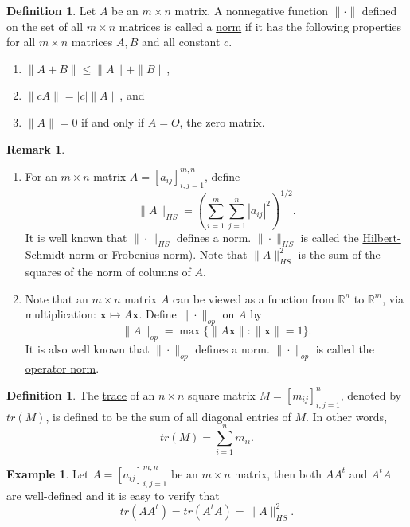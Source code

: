 \documentclass[12pt,letterpaper]{book}
\numberwithin{equation}{section}
\theoremstyle{definition}
\newtheorem{defi}[thm]{\textbf{Definition}}
\newtheorem{example}[thm]{\textbf{Example}}
\newtheorem{remark}[thm]{\textbf{Remark}}
\newcommand{\vx}{\bm{x}}
\begin{document}
\begin{defi}
Let $A$ be an $m\times n$ matrix. A nonnegative function $\|\cdot\|$ defined on the set of all $m\times n$ matrices is called a \underline{norm} if it has the following properties for all $m\times n$ matrices $A,B$ and all constant $c$.
\begin{enumerate}
\item $\|A+B\|\leq \|A\|+\|B\|$,
\item $\|cA\|=|c|\|A\|$, and
\item $\|A\|=0$ if and only if $A=O$, the zero matrix.
\end{enumerate}
\end{defi}

\begin{remark}\label{norms}\quad
\begin{enumerate}
\item For an $m\times n$ matrix $A=[a_{ij}]_{i,j=1}^{m,n}$, define
$$\|A\|_{HS}=\left(\sum_{i=1}^m\sum_{j=1}^n |a_{ij}|^2\right)^{1/2}.$$ It is well known that $\|\cdot\|_{HS}$ defines a norm. $\|\cdot\|_{HS}$ is called the \underline{Hilbert-Schmidt norm} or \underline{Frobenius norm}). Note that $\|A\|_{HS}^2$ is the sum of the squares of the norm of columns of $A$.
\item Note that an $m\times n$ matrix $A$ can be viewed as a function from $\mathbb{R}^n$ to $\mathbb{R}^m$, via multiplication: $\vx\mapsto A\vx$. Define $\|\cdot\|_{op}$ on $A$ by
$$\|A\|_{op}=\max \{\|A\vx\|:\|\vx\|=1\}.$$
It is also well known that $\|\cdot\|_{op}$ defines a norm. $\|\cdot\|_{op}$ is called the \underline{operator norm}.
\end{enumerate}
\end{remark}

\begin{defi}
The \underline{trace} of an $n\times n$ square matrix $M=[m_{ij}]_{i,j=1}^n$, denoted by $tr(M)$, is defined to be the sum of all diagonal entries of $M$. In other words,
$$tr(M)=\sum_{i=1}^n m_{ii}.$$
\end{defi}

\begin{example}\label{trace and norm}
Let $A=[a_{ij}]_{i,j=1}^{m,n}$ be an $m\times n$ matrix, then both $AA^t$ and $A^tA$ are well-defined and it is easy to verify that
$$tr(AA^t)=tr(A^tA)=\|A\|_{HS}^2.$$
\end{example}
\end{document}
